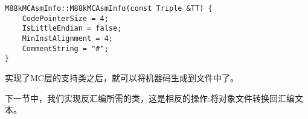 \begin{lstlisting}[caption={}]
M88kMCAsmInfo::M88kMCAsmInfo(const Triple &TT) {
	CodePointerSize = 4;
	IsLittleEndian = false;
	MinInstAlignment = 4;
	CommentString = "#";
}
\end{lstlisting}

实现了MC层的支持类之后，就可以将机器码生成到文件中了。\par

下一节中，我们实现反汇编所需的类，这是相反的操作:将对象文件转换回汇编文本。\par
























